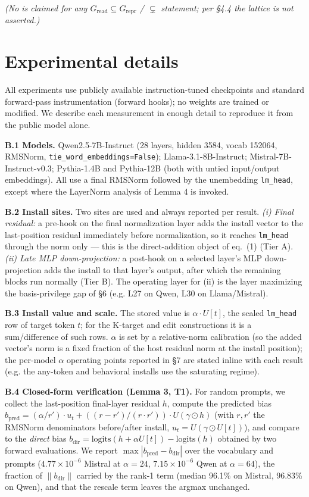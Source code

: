 \documentclass[11pt]{article}
\theoremstyle{plain}
\theoremstyle{definition}
\begin{document}
\emph{(No \qedsymbol is claimed for any $G_{\mathrm{read}} \subseteq G_{\mathrm{repr}}$ / $\subsetneq$ statement; per \S4.4 the lattice is not asserted.)}

\section{Experimental details}

All experiments use publicly available instruction-tuned checkpoints and standard forward-pass instrumentation (forward hooks); no weights are trained or modified. We describe each measurement in enough detail to reproduce it from the public model alone.

\textbf{B.1 Models.} Qwen2.5-7B-Instruct (28 layers, hidden 3584, vocab 152064, RMSNorm, \texttt{tie\_\allowbreak word\_\allowbreak embeddings\allowbreak =False}); Llama-3.1-8B-Instruct; Mistral-7B-Instruct-v0.3; Pythia-1.4B and Pythia-12B (both with untied input/output embeddings). All use a final RMSNorm followed by the unembedding \texttt{lm\_head}, except where the LayerNorm analysis of Lemma 4 is invoked.

\textbf{B.2 Install sites.} Two sites are used and always reported per result. \emph{(i) Final residual:} a pre-hook on the final normalization layer adds the install vector to the last-position residual immediately before normalization, so it reaches \texttt{lm\_head} through the norm only --- this is the direct-addition object of eq.~(1) (Tier A). \emph{(ii) Late MLP down-projection:} a post-hook on a selected layer's MLP down-projection adds the install to that layer's output, after which the remaining blocks run normally (Tier B). The operating layer for (ii) is the layer maximizing the basis-privilege gap of \S6 (e.g. L27 on Qwen, L30 on Llama/Mistral).

\textbf{B.3 Install value and scale.} The stored value is $\alpha\cdot U[t]$, the scaled \texttt{lm\_head} row of target token $t$; for the K-target and edit constructions it is a sum/difference of such rows. $\alpha$ is set by a relative-norm calibration (so the added vector's norm is a fixed fraction of the host residual norm at the install position); the per-model $\alpha$ operating points reported in \S7 are stated inline with each result (e.g. the any-token and behavioral installs use the saturating regime).

\textbf{B.4 Closed-form verification (Lemma 3, T1).} For random prompts, we collect the last-position final-layer residual $h$, compute the predicted bias $b_{\mathrm{pred}} = (\alpha/r')\cdot u_t + ((r-r')/(r\cdot r'))\cdot U(\gamma\odot h)$ (with $r,r'$ the RMSNorm denominators before/after install, $u_t = U(\gamma\odot U[t])$), and compare to the \emph{direct} bias $b_{\mathrm{dir}} = \mathrm{logits}(h+\alpha U[t]) - \mathrm{logits}(h)$ obtained by two forward evaluations. We report $\max|b_{\mathrm{pred}} - b_{\mathrm{dir}}|$ over the vocabulary and prompts ($4.77\times10^{-6}$ Mistral at $\alpha=24$, $7.15\times10^{-6}$ Qwen at $\alpha=64$), the fraction of $\lVert b_{\mathrm{dir}}\rVert$ carried by the rank-1 term (median 96.1\% on Mistral, 96.83\% on Qwen), and that the rescale term leaves the argmax unchanged.
\end{document}
